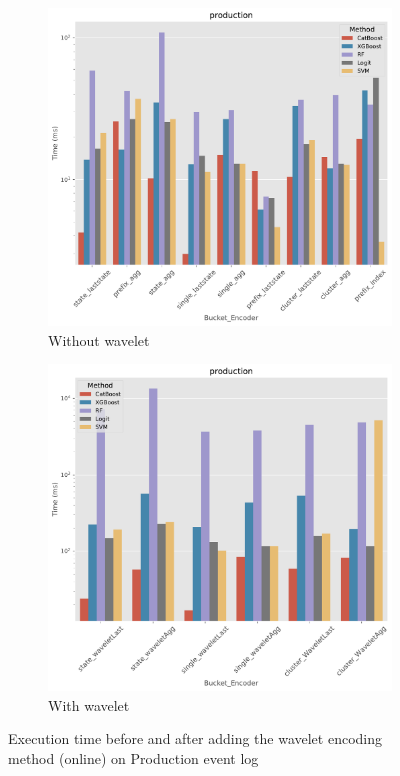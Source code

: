 \begin{figure}[!htbp] %

	\begin{subfigure}{0.48\textwidth}
		\includegraphics[width=\linewidth]{images/wavelet/time/p_c_production.pdf}
		\caption{Without wavelet} \label{fig:tw3}
	\end{subfigure}\hspace*{\fill}
	\begin{subfigure}{0.48\textwidth}
		\includegraphics[width=\linewidth]{images/wavelet/time/p_w_production.pdf}
		\caption{With wavelet} \label{fig:tw2}
	\end{subfigure}\hspace*{\fill}
		\caption{Execution time before and after adding the wavelet encoding method (online) on Production event log}
	\label{fig:wT2}
\end{figure}





